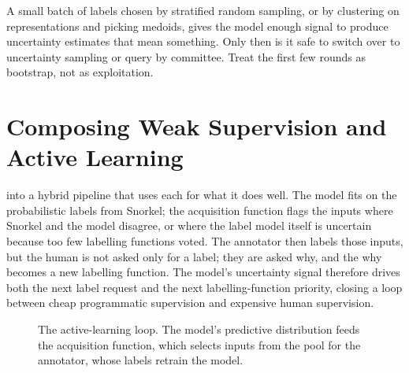  A small batch of labels chosen by stratified random sampling, or by clustering on representations and picking medoids, gives the model enough signal to produce uncertainty estimates that mean something. Only then is it safe to switch over to uncertainty sampling or query by committee. Treat the first few rounds as bootstrap, not as exploitation.


\newpage
\section{Composing Weak Supervision and Active Learning}


 into a hybrid pipeline that uses each for what it does well. The model fits on the probabilistic labels from Snorkel; the acquisition function flags the inputs where Snorkel and the model disagree, or where the label model itself is uncertain because too few labelling functions voted. The annotator then labels those inputs, but the human is not asked only for a label; they are asked why, and the why becomes a new labelling function. The model's uncertainty signal therefore drives both the next label request and the next labelling-function priority, closing a loop between cheap programmatic supervision and expensive human supervision.

\begin{figure}
\centering
{}
\caption{The active-learning loop. The model's predictive distribution feeds the acquisition function, which selects inputs from the pool for the annotator, whose labels retrain the model.}
\label{fig:active_learning_loop}
\end{figure}


